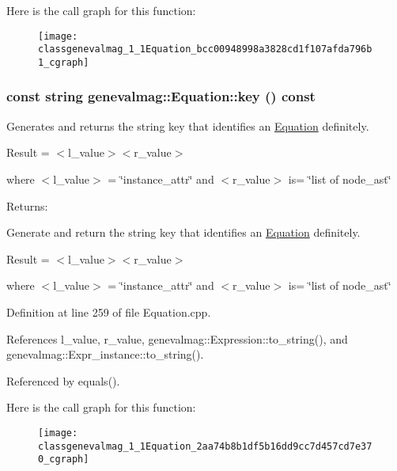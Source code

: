 Here is the call graph for this function:\nopagebreak
\begin{figure}[H]
\begin{center}
\leavevmode
\texttt{[image: classgenevalmag\_1\_1Equation\_bcc00948998a3828cd1f107afda796b1\_cgraph]}
\end{center}
\end{figure}
\hypertarget{classgenevalmag_1_1Equation_2aa74b8b1df5b16dd9cc7d457cd7e370}{
\subsubsection[{key}]{\setlength{\rightskip}{0pt plus 5cm}const string genevalmag::Equation::key () const}}
\label{classgenevalmag_1_1Equation_2aa74b8b1df5b16dd9cc7d457cd7e370}


Generates and returns the string key that identifies an \hyperlink{classgenevalmag_1_1Equation}{Equation} definitely.\par
 \par
 Result = $<$l\_\-value$>$$<$r\_\-value$>$\par
 \par
 where $<$l\_\-value$>$ = \char`\"{}instance\_\-attr\char`\"{} and $<$r\_\-value$>$ is= \char`\"{}list of node\_\-ast\char`\"{}\par


\begin{Desc}
\item[Returns:]\end{Desc}
Generate and return the string key that identifies an \hyperlink{classgenevalmag_1_1Equation}{Equation} definitely.

Result = $<$l\_\-value$>$$<$r\_\-value$>$

where $<$l\_\-value$>$ = \char`\"{}instance\_\-attr\char`\"{} and $<$r\_\-value$>$ is= \char`\"{}list of node\_\-ast\char`\"{} 

Definition at line 259 of file Equation.cpp.

References l\_\-value, r\_\-value, genevalmag::Expression::to\_\-string(), and genevalmag::Expr\_\-instance::to\_\-string().

Referenced by equals().

Here is the call graph for this function:\nopagebreak
\begin{figure}[H]
\begin{center}
\leavevmode
\texttt{[image: classgenevalmag\_1\_1Equation\_2aa74b8b1df5b16dd9cc7d457cd7e370\_cgraph]}
\end{center}
\end{figure}



